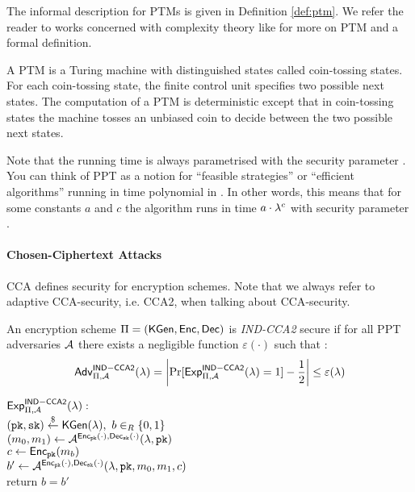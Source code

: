 \noindent
The informal description for \aclp{PTM} is given in Definition \ref{def:ptm}.
We refer the reader to works concerned with complexity theory like \cite{santos1969,WaterlooComplexity} for more on \ac{PTM} and a formal definition.

\begin{definition}\label{def:ptm}
A \ac{PTM} is a Turing machine with distinguished states called coin-tossing states.
For each coin-tossing state, the finite control unit specifies two possible next states.
The computation of a \ac{PTM} is deterministic except that in coin-tossing states the machine tosses an unbiased coin to decide between the two possible next states.
\end{definition}

\noindent
Note that the running time is always parametrised with the security parameter \secpar.
You can think of \ac{PPT} as a notion for ``feasible strategies'' or ``efficient algorithms'' running in time polynomial in \secpar.
In other words, this means that for some constants $a$ and $c$ the algorithm runs in time $a\cdot \lambda^c$ with security parameter \secpar \cite{katz2008introduction}.

\paragraph{Chosen-Ciphertext Attacks}
\ac{CCA} defines security for encryption schemes.
Note that we always refer to adaptive \ac{CCA}-security, i.e. \ac{CCA}2, when talking about \ac{CCA}-security.

\begin{definition}\label{def:indcca2}
An encryption scheme $\Pi=(\mathsf{KGen},\mathsf{Enc},\mathsf{Dec})$ is \emph{IND-CCA2} secure if for all \ac{PPT} adversaries $\mathcal{A}$ there exists a negligible function $\varepsilon(\cdot)$ such that :
\[\mathsf{Adv}_{\Pi,\mathcal{A}}^{\mathsf{IND-CCA2}}(\lambda)=\left|\Pr[\mathsf{Exp}^{\mathsf{IND-CCA2}}_{\Pi,\mathcal{A}}(\lambda)=1]-\frac12\right|\leq\varepsilon(\lambda)\]

\noindent
$\mathsf{Exp}^{\mathsf{IND-CCA2}}_{\Pi,\mathcal{A}}(\lambda):$\\
\hspace*{2em}$(\mathtt{pk},\mathtt{sk})\stackrel{\$}{\gets}\mathsf{KGen}(\lambda),~b\in_R\{0,1\}$\\
\hspace*{2em}$(m_0,m_1)\gets\mathcal{A}^{\mathsf{Enc}_\mathtt{pk}(\cdot),\mathsf{Dec}_\mathtt{sk}(\cdot)}(\lambda,\mathtt{pk})$\\
\hspace*{2em}$c\gets\mathsf{Enc}_\mathtt{pk}(m_b)$\\
\hspace*{2em}$b'\gets\mathcal{A}^{\mathsf{Enc}_\mathtt{pk}(\cdot),\mathsf{Dec}_\mathtt{sk}(\cdot)}(\lambda,\mathtt{pk},m_0,m_1,c)$\\
\hspace*{2em}return $b=b'$
\eod
\end{definition}


